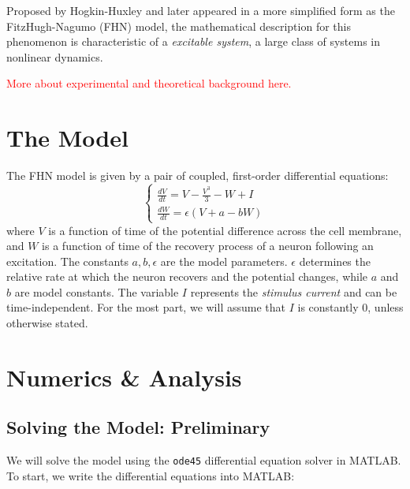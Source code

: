 \documentclass{book}
\theoremstyle{definition}
\newcommand{\f}[2]{\frac{#1}{#2}}
\begin{document}
Proposed by Hogkin-Huxley and later appeared in a more simplified form as the FitzHugh-Nagumo (FHN) model, the mathematical description for this phenomenon is characteristic of a \textit{excitable system}, a large class of systems in nonlinear dynamics.




\textcolor{red}{More about experimental and theoretical background here.} 



\section{The Model}

The FHN model is given by a pair of coupled, first-order differential equations:
\begin{equation*}
\begin{cases}
\f{dV}{dt}= V - \f{V^3}{3} - W + I \\
\f{dW}{dt} = \epsilon(V + a - bW)
\end{cases}
\end{equation*}
where $V$ is a function of time of the potential difference across the cell membrane, and $W$ is a function of time of the recovery process of a neuron following an excitation.  The constants $a,b,\epsilon$ are the model parameters. $\epsilon$ determines the relative rate at which the neuron recovers and the potential changes, while $a$ and $b$ are model constants. The variable $I$ represents the \textit{stimulus current} and can be time-independent. For the most part, we will assume that $I$ is constantly 0, unless otherwise stated. 

 







\section{Numerics \& Analysis}

%

\subsection{Solving the Model: Preliminary}

We will solve the model using the \texttt{ode45} differential equation solver in MATLAB. To start, we write the differential equations into MATLAB:
\end{document}
